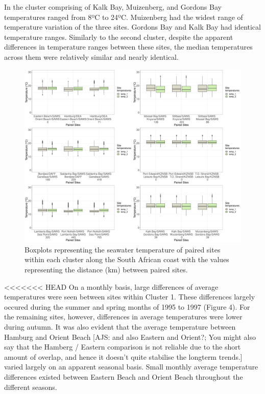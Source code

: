 \documentclass[12pt,A4paper,]{article}
\begin{document}
In the cluster comprising of Kalk Bay, Muizenberg, and Gordons Bay
temperatures ranged from 8ºC to 24ºC. Muizenberg had the widest range of
temperature variation of the three sites. Gordons Bay and Kalk Bay had
identical temperature ranges. Similarly to the second cluster, despite
the apparent differences in temperature ranges between these sites, the
median temperatures across them were relatively similar and nearly
identical.

\begin{figure}
\centering
\includegraphics{../figures/combined_plot.pdf}
\caption{Boxplots representing the seawater temperature of paired sites
within each cluster along the South African coast with the values
representing the distance (km) between paired sites.}
\end{figure}

<<<<<<< HEAD
On a monthly basis, large differences of average temperatures were seen
between sites within Cluster 1. These differences largely occured during
the summer and spring months of 1995 to 1997 (Figure 4). For the
remaining sites, however, differences in average temperatures were lower
during autumn. It was also evident that the average temperature between
Hamburg and Orient Beach {[}AJS: and also Eastern and Orient?; You might
also say that the Hamberg / Eastern comparison is not reliable due to
the short amount of overlap, and hence it doesn't quite stabilise the
longterm trends.{]} varied largely on an apparent seasonal basis. Small
monthly average temperature differences existed between Eastern Beach
and Orient Beach throughout the different seasons.
\end{document}
